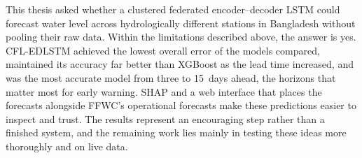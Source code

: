 This thesis asked whether a clustered federated encoder--decoder LSTM could
forecast water level across hydrologically different stations in Bangladesh
without pooling their raw data. Within the limitations described above, the
answer is yes. CFL-EDLSTM achieved the lowest overall error of the models
compared, maintained its accuracy far better than XGBoost as the lead time
increased, and was the most accurate model from three to 15~days ahead, the
horizons that matter most for early warning. SHAP and a web interface that
places the forecasts alongside FFWC's operational forecasts make these
predictions easier to inspect and trust. The results represent an encouraging
step rather than a finished system, and the remaining work lies mainly in
testing these ideas more thoroughly and on live data.